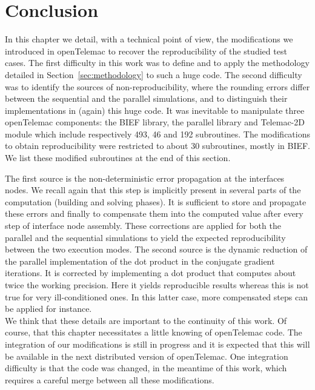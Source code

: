 \section{Conclusion}
%
In this chapter we detail, with a technical point of view,
the modifications we introduced in openTelemac to recover
the reproducibility of the studied test cases.
The first difficulty in this work was to define and
to apply the methodology detailed in Section~\ref{sec:methodology}
to such a huge code.
The second difficulty was to identify the sources of non-reproducibility,
\ie where the rounding errors differ between
the sequential and the parallel simulations, and to distinguish
their implementations in (again) this huge code.
%
It was inevitable to manipulate three openTelemac components:
the BIEF library, the parallel library and Telemac-2D module
which include respectively 493, 46 and 192 subroutines.
The modifications to obtain reproducibility were restricted to
about 30 subroutines, mostly in BIEF.
We list these modified subroutines at the end of this section.

The first source is the non-deterministic error propagation at the interfaces nodes.
We recall again that this step is implicitly present in several parts of the
computation (building and solving phases).
It is sufficient to store and propagate these errors and finally to
compensate them into the computed value after every step of interface node
assembly.
These corrections are applied for both the parallel and the
sequential simulations to yield the expected reproducibility
between the two execution modes.
The second source is the dynamic reduction of the parallel
implementation of the dot product in the conjugate gradient
iterations. It is corrected by implementing a dot product that
computes about twice the working precision.
Here it yields reproducible results whereas this is not true
for very ill-conditioned ones. In this latter case, more compensated
steps can be applied for instance. \\

We think that these details are important to the continuity of this work.
Of course, that this chapter necessitates a little knowing of openTelemac code.
The integration of our modifications is still in progress and
it is expected that this will be
available in the next distributed version of openTelemac.
One integration difficulty is that the code
was changed, in the meantime of this work, which requires
a careful merge between all these modifications.
%
